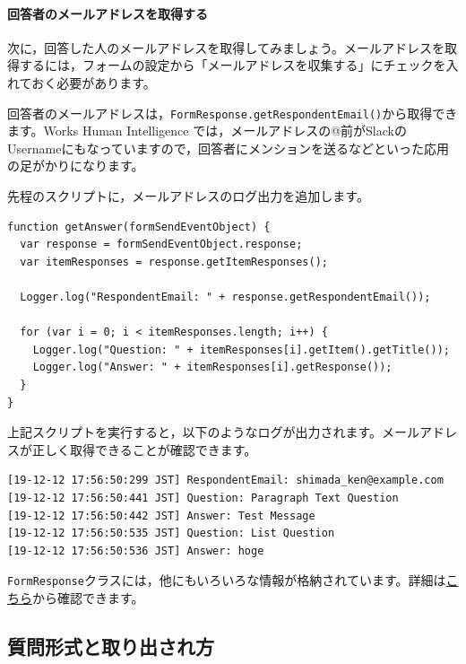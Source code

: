\documentclass[uplatex,a4j]{jsarticle}
\begin{document}
\paragraph{回答者のメールアドレスを取得する}

次に，回答した人のメールアドレスを取得してみましょう。メールアドレスを取得するには，フォームの設定から「メールアドレスを収集する」にチェックを入れておく必要があります。


回答者のメールアドレスは，\verb|FormResponse.getRespondentEmail()|から取得できます。Works Human Intelligence では，メールアドレスの@前がSlackのUsernameにもなっていますので，回答者にメンションを送るなどといった応用の足がかりになります。

先程のスクリプトに，メールアドレスのログ出力を追加します。

\begin{lstlisting}[basicstyle=\ttfamily\footnotesize,frame=single,caption=Event Object sample 5]
function getAnswer(formSendEventObject) {
  var response = formSendEventObject.response;
  var itemResponses = response.getItemResponses();
  
  Logger.log("RespondentEmail: " + response.getRespondentEmail());
  
  for (var i = 0; i < itemResponses.length; i++) {
    Logger.log("Question: " + itemResponses[i].getItem().getTitle());
    Logger.log("Answer: " + itemResponses[i].getResponse());
  }
}
\end{lstlisting}

上記スクリプトを実行すると，以下のようなログが出力されます。メールアドレスが正しく取得できることが確認できます。

\begin{lstlisting}[basicstyle=\ttfamily\footnotesize,frame=single,caption=Event Object output example 4]
[19-12-12 17:56:50:299 JST] RespondentEmail: shimada_ken@example.com
[19-12-12 17:56:50:441 JST] Question: Paragraph Text Question
[19-12-12 17:56:50:442 JST] Answer: Test Message
[19-12-12 17:56:50:535 JST] Question: List Question
[19-12-12 17:56:50:536 JST] Answer: hoge
\end{lstlisting}


\verb|FormResponse|クラスには，他にもいろいろな情報が格納されています。詳細は\href{https://developers.google.com/apps-script/reference/forms/form-response?hl=en}{こちら}から確認できます。

\subsection{質問形式と取り出され方}
\end{document}
